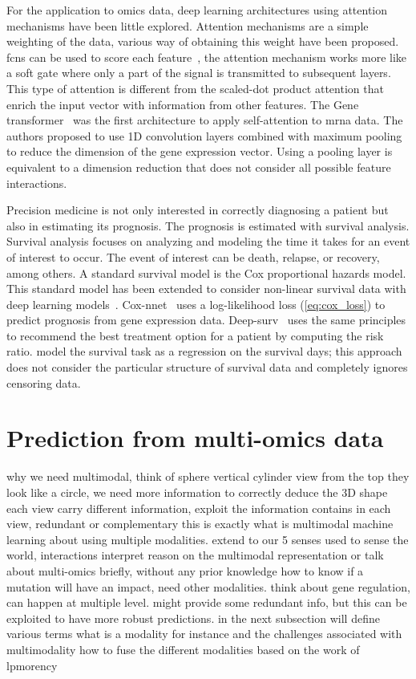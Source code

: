 \documentclass[../main.tex]{subfiles}
\begin{document}
 For the application to omics data, deep learning architectures using attention mechanisms have been little explored.
 Attention mechanisms are a simple weighting of the data, various way of obtaining this weight have been proposed.
 \Glspl{fcn} can be used to score each feature~\cite{Lee2022,beykikhoshkDeepTRIAGEInterpretableIndividualised2020a}, the attention mechanism works more like a soft gate where only a part of the signal is transmitted to subsequent layers.
 This type of attention is different from the scaled-dot product attention that enrich the input vector with information from other features.
 The Gene transformer~\cite{Khan2023} was the first architecture to apply self-attention to \gls{mrna} data.
 The authors proposed to use 1D convolution layers combined with maximum pooling to reduce the dimension of the gene expression vector.
 Using a pooling layer is equivalent to a dimension reduction that does not consider all possible feature interactions.

 Precision medicine is not only interested in correctly diagnosing a patient but also in estimating its prognosis.
 The prognosis is estimated with survival analysis.
 Survival analysis focuses on analyzing and modeling the time it takes for an event of interest to occur.
 The event of interest can be death, relapse, or recovery, among others.
 A standard survival model is the Cox proportional hazards model.
 This standard model has been extended to consider non-linear survival data with deep learning models~\cite{katzmanDeepSurvPersonalizedTreatment2018,Ching2018}.
 Cox-nnet~\cite{Ching2018} uses a log-likelihood loss (\cref{eq:cox_loss}) to predict prognosis from gene expression data.
 Deep-surv~\cite{katzmanDeepSurvPersonalizedTreatment2018} uses the same principles to recommend the best treatment option for a patient by computing the risk ratio.
 \citeauthor{Lee2022} model the survival task as a regression on the survival days; this approach does not consider the particular structure of survival data and completely ignores censoring data.

\section{Prediction from multi-omics data}
why we need multimodal, think of sphere vertical cylinder 
view from the top they look like a circle, we need more information to correctly deduce the 3D shape
each view carry different information, exploit the information contains in each view, redundant or complementary
this is exactly what is multimodal machine learning about using multiple modalities. 
extend to our 5 senses used to sense the world, interactions interpret reason on the multimodal representation 
or talk about multi-omics briefly, without any prior knowledge how to know if a mutation will have an impact, need other modalities.
think about gene regulation, can happen at multiple level. 
might provide some redundant info, but this can be exploited to have more robust predictions. 
in the next subsection will define various terms what is a modality for instance and the challenges associated with multimodality
how to fuse the different modalities
based on the work of lpmorency 
\end{document}

